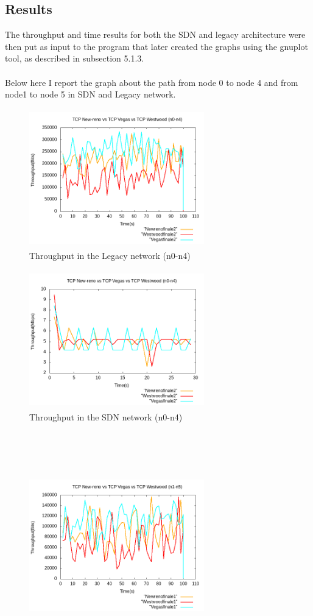 {{\subsection{Results}{
The throughput and time results for both the SDN and legacy architecture were then put as input to the program that later created the graphs using the gnuplot tool, as described in subsection 5.1.3.\\\\
Below here I report the graph about the path from node 0 to node 4 and from node1 to node 5 in SDN and Legacy network.
\begin{figure}[!htb]
	\includegraphics[width=7.6cm,height=6.0cm]{Legacy_n0-n4}
	\caption{Throughput in the Legacy network (n0-n4)}
	\label{figure}
\end{figure}
\begin{figure}[!htb]
	\includegraphics[width=7.6cm,height=6.0cm]{SDN_n0-n4}
	\caption{ Throughput in the SDN network (n0-n4)}
	\label{figure}
\end{figure}
\\\\\\
\begin{figure}[!htb]
	\includegraphics[width=7.6cm,height=6.0cm]{Legacy_n1-n5}

\end{figure}}}}
